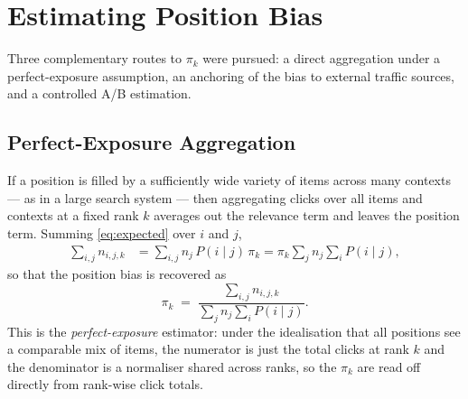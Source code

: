 \section{Estimating Position Bias}
\label{sec:pb-estimate}

Three complementary routes to $\pi_k$ were pursued: a direct aggregation under
a perfect-exposure assumption, an anchoring of the bias to external traffic
sources, and a controlled A/B estimation.

\subsection{Perfect-Exposure Aggregation}
\label{sec:pb-perfect}
If a position is filled by a sufficiently wide variety of items across many
contexts --- as in a large search system --- then aggregating clicks over all
items and contexts at a fixed rank $k$ averages out the relevance term and
leaves the position term. Summing \eqref{eq:expected} over $i$ and $j$,
\begin{align}
  \sum_{i,j} n_{i,j,k}
    &= \sum_{i,j} n_j\,P(i\mid j)\,\pi_k
     = \pi_k \sum_{j} n_j \sum_{i} P(i\mid j),
  \label{eq:perfect-sum}
\end{align}
so that the position bias is recovered as
\begin{equation}
  \label{eq:perfect-pi}
  \pi_k \;=\;
    \frac{\sum_{i,j} n_{i,j,k}}
         {\sum_{j} n_j \sum_{i} P(i\mid j)} .
\end{equation}
This is the \emph{perfect-exposure} estimator: under the idealisation that all
positions see a comparable mix of items, the numerator is just the total clicks
at rank $k$ and the denominator is a normaliser shared across ranks, so the
$\pi_k$ are read off directly from rank-wise click totals.

